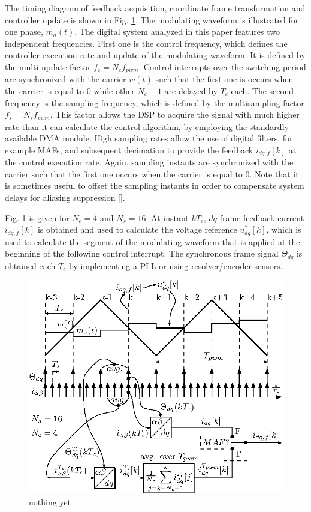 \documentclass[journal]{IEEEtran}
\begin{document}
The timing diagram of feedback acquisition, coordinate frame transformation and controller update is shown in Fig. \ref{fig:timings}. The modulating waveform is illustrated for one phase, $m_a(t)$.
The digital system analyzed in this paper features two independent frequencies. First one is the control frequency, which defines the controller execution rate and update of the modulating waveform. It is defined by the multi-update factor $f_c = N_c f_{pwm}$. Control interrupts over the switching period are synchronized with the carrier $w(t)$ such that the first one is occurs when the carrier is equal to $0$ while other $N_c-1$ are delayed by $T_c$ each. 
The second frequency is the sampling frequency, which is defined by the multisampling factor $f_s = N_s f_{pwm}$. This factor allows the DSP to acquire the signal with much higher rate than it can calculate the control algorithm, by employing the standardly available DMA module. High sampling rates allow the use of digital filters, for example MAFs, and subsequent decimation to provide the feedback $i_{dq,f}[k]$ at the control execution rate.
Again, sampling instants are synchronized with the carrier such that the first one occurs when the carrier is equal to $0$. Note that it is sometimes useful to offset the sampling instants in order to compensate system delays for aliasing suppression [].


Fig. \ref{fig:timings} is given for $N_c = 4$ and $N_s = 16$. At instant $kT_c$, $dq$ frame feedback current $i_{dq,f}[k]$ is obtained and used to calculate the voltage reference $u^*_{dq}[k]$, which is used to calculate the segment of the modulating waveform that is applied at the beginning of the following control interrupt. The synchronous frame signal $\Theta_{dq}$ is obtained each $T_c$ by implementing a PLL or using resolver/encoder sensors. 

\begin{figure}[t!]
    \centerline{\includegraphics[width=0.95\linewidth]{figures/timing_diagram.eps}}
    \caption{nothing yet}
    \label{fig:timings}
\end{figure}
\end{document}

